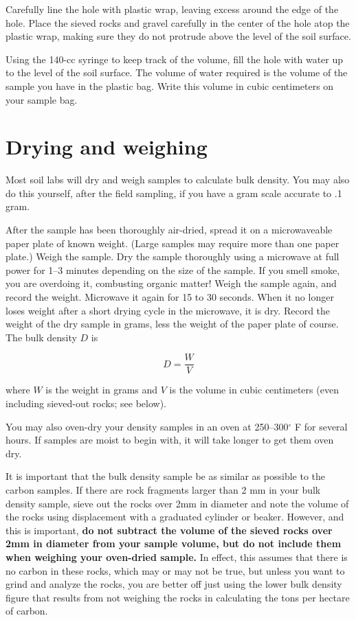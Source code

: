 \documentclass[11pt,letterpaper,twoside,onecolumn]{memoir}
\begin{document}
Carefully line the hole with plastic wrap, leaving excess around the edge of the hole. Place the sieved rocks and gravel carefully in the center of the hole atop the plastic wrap, making sure they do not protrude above the level of the soil surface.

Using the 140-cc syringe to keep track of the volume, fill the hole with water up to the level of the soil surface. The volume of water required is the volume of the sample you have in the plastic bag. Write this volume in cubic centimeters on your sample bag.

\section*{Drying and weighing}

Most soil labs will dry and weigh samples to calculate bulk density. You may also do this yourself, after the field sampling, if you have a gram scale accurate to .1 gram.

After the sample has been thoroughly air-dried, spread it on a microwaveable paper plate of known weight. (Large samples may require more than one paper plate.) Weigh the sample. Dry the sample thoroughly using a microwave at full power for 1--3 minutes depending on the size of the sample. If you smell smoke, you are overdoing it, combusting organic matter! Weigh the sample again, and record the weight. Microwave it again for 15 to 30 seconds. When it no longer loses weight after a short drying cycle in the microwave, it is dry. Record the weight of the dry sample in grams, less the weight of the paper plate of course. The bulk density $D$ is

\begin{equation}D = \frac{W}{V}\end{equation}

\noindent where $W$ is the weight in grams and $V$ is the volume in cubic centimeters (even including sieved-out rocks; see below).

You may also oven-dry your density samples in an oven at 250--300$^{\circ}$ F for several hours. If samples are moist to begin with, it will take longer to get them oven dry.

It is important that the bulk density sample be as similar as possible to the carbon samples. If there are rock fragments larger than 2 mm in your bulk density sample, sieve out the rocks over 2mm in diameter and note the volume of the rocks using displacement with a graduated cylinder or beaker. However, and this is important, \textbf{do not subtract the volume of the sieved rocks over 2mm in diameter from your sample volume, but do not include them when weighing your oven-dried sample.} In effect, this assumes that there is no carbon in these rocks, which may or may not be true, but unless you want to grind and analyze the rocks, you are better off just using the lower bulk density figure that results from not weighing the rocks in calculating the tons per hectare of carbon.
\end{document}
